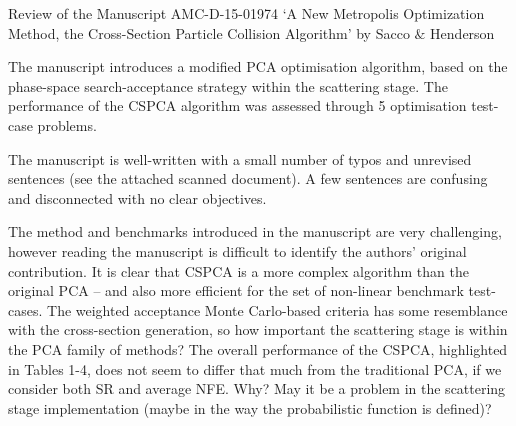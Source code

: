 \documentclass[14pt,twoside]{report}
\begin{document}
{
  

\vfill
\clearpage



\begin{center}
  {\Large Review of the Manuscript AMC-D-15-01974 `A New Metropolis Optimization Method, the Cross-Section Particle Collision Algorithm' by Sacco $\&$ Henderson}
\end{center}

\medskip

The manuscript introduces a modified PCA optimisation algorithm, based on the phase-space search-acceptance strategy within the scattering stage. The performance of the CSPCA algorithm was assessed through 5 optimisation test-case problems.

 
The manuscript is well-written with a small number of typos and unrevised sentences (see the attached scanned document). A few sentences are confusing and disconnected with no clear objectives. 

The method and benchmarks introduced in the manuscript are very challenging, however reading the manuscript is difficult to identify the authors' original contribution. It is clear that CSPCA is a more complex algorithm than the original PCA -- and also more efficient for the set of non-linear benchmark test-cases. The weighted acceptance Monte Carlo-based criteria has some resemblance with the cross-section generation, so how important the scattering stage is within the PCA family of methods? The overall performance of the CSPCA, highlighted in Tables 1-4, does not seem to differ that much from the traditional PCA, if we consider both SR and average NFE. Why? May it be a problem in the scattering stage implementation (maybe in the way the probabilistic function is defined)?  

{
  


\afterpage{%
    \clearpage%
    \thispagestyle{empty}%
    \begin{landscape}%
        \centering %
        \vfill
    \end{landscape}
    \clearpage%
}
\vfill
\clearpage




}}
\end{document}
